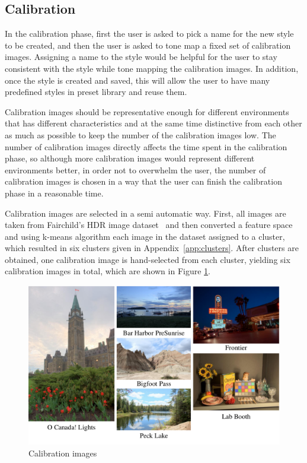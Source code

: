 \subsection{Calibration}
In the calibration phase, first the user is asked to pick a name for the new style to be created, and then the user is asked to tone map a fixed set of calibration images. Assigning a name to the style would be helpful for the user to stay consistent with the style while tone mapping the calibration images. In addition, once the style is created and saved, this will allow the user to have many predefined styles in preset library and reuse them. 

Calibration images should be representative enough for different environments that has different characteristics and at the same time distinctive from each other as much as possible to keep the number of the calibration images low. The number of calibration images directly affects the time spent in the calibration phase, so although more calibration images would represent different environments better, in order not to overwhelm the user, the number of calibration images is chosen in a way that the user can finish the calibration phase in a reasonable time.

Calibration images are selected in a semi automatic way. First, all images are taken from Fairchild's HDR image dataset~\cite{fairchild2007hdr} and then converted a feature space and using k-means algorithm each image in the dataset assigned to a cluster, which resulted in six clusters given in Appendix~\ref{app:clusters}. After clusters are obtained, one calibration image is hand-selected from each cluster, yielding six calibration images in total, which are shown in Figure \ref{fig:calibration_images}.

\begin{figure}
\begin{center}
\includegraphics[width=\textwidth]{figures/chapter5/temp_calibration_images.png}
\caption{Calibration images
}
\label{fig:calibration_images}
\end{center}
\end{figure}

